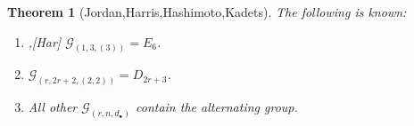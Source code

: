 \documentclass[final]{beamer}
\theoremstyle{thrm}
\newtheorem{thm}{Theorem}
\newcommand{\blue}[1]{{\color{black!15!aggiemaroon}\underline{#1}}}
\begin{document}
\begin{frame}
\begin{minipage}[t]{.3\textwidth}
\vspace{.4cm}

\begin{thm}[\raisebox{-.1cm}{\,}Jordan,Harris,Hashimoto,Kadets\raisebox{.9cm}{\,}]
\vspace{.2cm}
The following is known:
\begin{enumerate}
\item[$\bullet$] [J],[Har] $\mathcal{G}_{(1,3,(3))} = E_6$.

\vspace{.4cm}

\item[$\bullet$] [Has,K] $\mathcal{G}_{(r,2r+2,(2,2))} = D_{2r+3}$.

\vspace{.4cm}

\item[$\bullet$] [Has,K] All other $\mathcal{G}_{(r,n,d_\bullet)}$ contain the alternating group.
\end{enumerate}
\vspace{.1cm}
\end{thm}

\vspace{0cm}







%


\end{minipage}
\end{frame}
\end{document}
